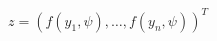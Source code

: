 \documentclass[10pt]{article}
\begin{document}
\begin{align*}z = \left( f\left(y_1, \psi\right), \dots, f\left(y_n,\psi\right)\right)^T\end{align*}
\end{document}
